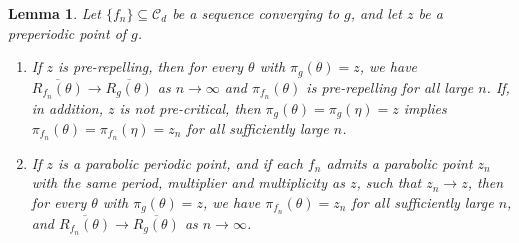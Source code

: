 \documentclass[10pt,a4paper]{amsart}
\newtheorem{lemma}{Lemma}
\def\CCCC{\mathscr C}
\begin{document}
\begin{lemma}\label{lem:stable}
Let $\{f_n\}\subseteq\CCCC_d$ be a sequence converging to $g$, and let $z$ be a preperiodic point of $g$.
\begin{enumerate}
\item If $z$ is pre-repelling, then for every $\theta$ with $\pi_g(\theta)=z$, we have  $\overline{R_{f_n}(\theta)}\to\overline{R_g(\theta)}$ as $n\to\infty$ and  $\pi_{f_n}(\theta)$ is pre-repelling for all large $n$. If, in addition, $z$ is not pre-critical, then  $\pi_g(\theta)=\pi_g(\eta)=z$ implies $\pi_{f_n}(\theta)=\pi_{f_n}(\eta)=z_n$ for all sufficiently large $n$.\vspace{2pt}

\item If $z$ is a parabolic periodic point, and if each $f_n$ admits a parabolic point $z_n$ with the same period, multiplier and multiplicity as $z$, such that $z_n\to z$, then for every $\theta$ with $\pi_g(\theta)=z$, we have $\pi_{f_n}(\theta)=z_n$ for all sufficiently large $n$, and $\overline{R_{f_n}(\theta)}\to\overline{R_g(\theta)}$ as $n\to\infty$.
\end{enumerate}\end{lemma}
\end{document}
